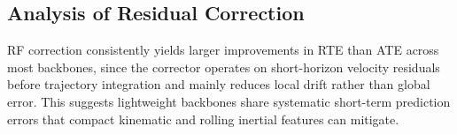 \documentclass[10pt,conference,letterpaper]{IEEEtran}
\begin{document}
\begin{table}[htbp]
\caption{Unseen Test Set Results (Generalization, Mean $\pm$ Std over 32 Sequences)}
\label{tab:unseen}
\centering
\scriptsize
{}
\end{table}


\subsection{Analysis of Residual Correction}


RF correction consistently yields larger improvements in RTE than ATE across most backbones, since the corrector operates on short-horizon velocity residuals before trajectory integration and mainly reduces local drift rather than global error. This suggests lightweight backbones share systematic short-term prediction errors that compact kinematic and rolling inertial features can mitigate.
\end{document}
